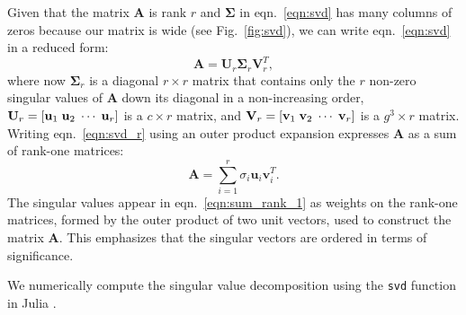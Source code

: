 \documentclass[journal=jacsat,manuscript=article,layout=traditional]{achemso}
\begin{document}
Given that the matrix $\mathbf{A}$ is rank $r$ and $\mathbf{\Sigma}$ in eqn.~\ref{eqn:svd} has many columns of zeros because our matrix is wide (see Fig.~\ref{fig:svd}), we can write eqn.~\ref{eqn:svd} in a reduced form:
\begin{equation}
\mathbf{A}=\mathbf{U}_r \mathbf{\Sigma}_r \mathbf{V}_r^T,
\label{eqn:svd_r}
\end{equation} where now $\mathbf{\Sigma}_r$ is a diagonal $r\times r$ matrix that contains only the $r$ non-zero singular values of $\mathbf{A}$ down its diagonal in a non-increasing order, $\mathbf{U}_r=[\mathbf{u}_1\hspace{1mm} \mathbf{u}_2\hspace{1mm} \cdots \hspace{1mm}\mathbf{u}_r]$ is a $c\times r$ matrix, and $\mathbf{V}_r=[\mathbf{v}_1\hspace{1mm} \mathbf{v}_2\hspace{1mm}\cdots \hspace{1mm}\mathbf{v}_r]$ is a $g^3\times r$ matrix. Writing eqn.~\ref{eqn:svd_r} using an outer product expansion expresses $\mathbf{A}$ as a sum of rank-one matrices:
\begin{equation}
\mathbf{A} = \displaystyle \sum_{i=1}^r \sigma_i \mathbf{u}_i\mathbf{v}_i^T.
\label{eqn:sum_rank_1}
\end{equation} The singular values appear in eqn.~\ref{eqn:sum_rank_1} as weights on the rank-one matrices, formed by the outer product of two unit vectors, used to construct the matrix $\mathbf{A}$. This emphasizes that the singular vectors are ordered in terms of significance.

We numerically compute the singular value decomposition using the \texttt{svd} function in Julia \cite{julia}.
\end{document}
